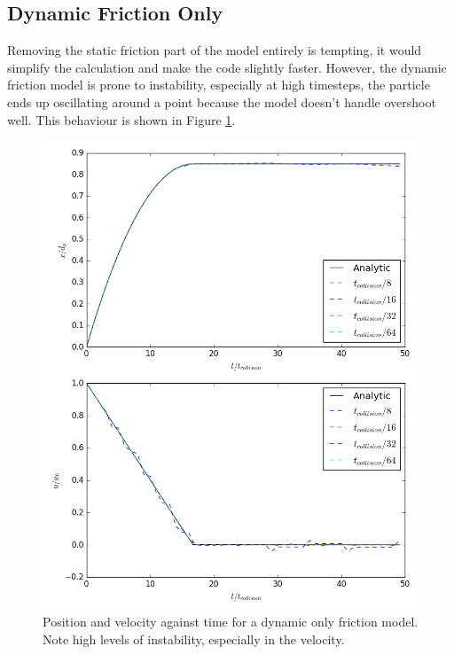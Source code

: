 \documentclass[10pt,a4paper,titlepage]{report}
\begin{document}
\subsection{Dynamic Friction Only}
Removing the static friction part of the model entirely is tempting, it would simplify the calculation and make the code slightly faster. However, the dynamic friction model is prone to instability, especially at high timesteps, the particle ends up oscillating around a point because the model doesn't handle overshoot well. This behaviour is shown in Figure \ref{fig:dynamic_only}.
\begin{figure}[!ht]
\centering
\includegraphics[scale=0.65]{figures/friction_model/dynamic_only.png}
\caption{Position and velocity against time for a dynamic only friction model. Note high levels of instability, especially in the velocity.}
\label{fig:dynamic_only}
\end{figure}
\end{document}
